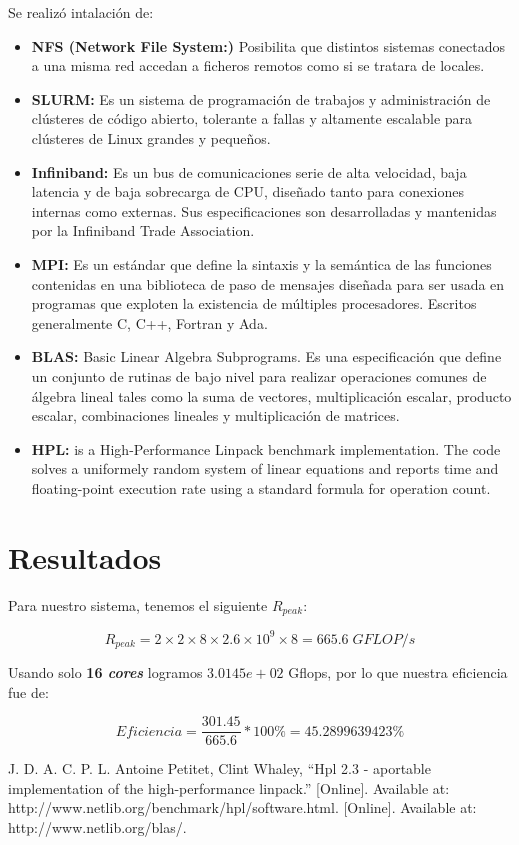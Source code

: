 \documentclass[conference]{IEEEtran}
\begin{document}
Se realizó intalación de:

\begin{itemize}
    \item \textbf{NFS (Network File System:)} Posibilita que distintos sistemas
conectados a una misma red accedan a ficheros remotos como si 
se tratara de locales.

    \item \textbf{SLURM:} Es un sistema de programación de trabajos y administración
    de clústeres de código abierto, tolerante a fallas y altamente escalable 
    para clústeres de Linux grandes y pequeños.

    \item \textbf{Infiniband:} Es un bus de comunicaciones serie de alta velocidad, 
    baja latencia y de baja sobrecarga de CPU, diseñado tanto para 
    conexiones internas como externas. Sus especificaciones son 
    desarrolladas y mantenidas por la Infiniband Trade Association.

    \item \textbf{MPI:} Es un estándar que define la sintaxis y la semántica de las 
    funciones contenidas en una biblioteca de paso de mensajes diseñada 
    para ser usada en programas que exploten la existencia de múltiples 
    procesadores. Escritos generalmente C, C++, Fortran y Ada.

    \item \textbf{BLAS:} Basic Linear Algebra Subprograms. Es una especificación que 
    define un conjunto de rutinas de bajo nivel para realizar operaciones 
    comunes de álgebra lineal tales como la suma de vectores, multiplicación 
    escalar, producto escalar, combinaciones lineales y multiplicación de matrices.

    \item \textbf{HPL:} is a High-Performance Linpack benchmark implementation. The code solves a 
    uniformely random system of  linear equations and reports time and floating-point 
    execution rate using a standard formula for operation count.

\end{itemize}
    
\section{Resultados}

Para nuestro sistema, tenemos el siguiente \(R_{peak}\):

\[ R_{peak} = 2 \times 2 \times 8 \times 2.6 \times 10^9 \times 8 = 665.6 \; GFLOP/s \]

Usando solo \textbf{ 16 \textit{cores}} logramos \( 3.0145e+02 \) Gflops, por lo que nuestra eficiencia fue de:

\[ Eficiencia = \frac{301.45}{665.6} * 100\% = 45.2899639423 \% \]

\begin{thebibliography}{00}
 J. D. A. C. P. L. Antoine Petitet, Clint Whaley, “Hpl 2.3 - aportable implementation of the high-performance linpack.” [Online]. Available at: http://www.netlib.org/benchmark/hpl/software.html.
 [Online]. Available at: http://www.netlib.org/blas/.
\end{thebibliography}
\end{document}
